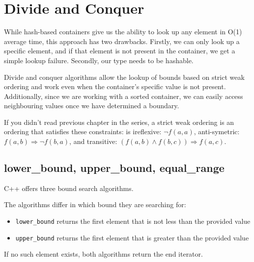 \section{Divide and Conquer}



While hash-based containers give us the ability to look up any element in O(1) average time, this approach has two drawbacks. Firstly, we can only look up a specific element, and if that element is not present in the container, we get a simple lookup failure. Secondly, our type needs to be hashable.

Divide and conquer algorithms allow the lookup of bounds based on strict weak ordering and work even when the container’s specific value is not present. Additionally, since we are working with a sorted container, we can easily access neighbouring values once we have determined a boundary.

If you didn’t read previous chapter in the series, a strict weak ordering is an ordering that satisfies these constraints: is ireflexive: $\neg f(a,a)$, anti-symetric: $f(a,b) \Rightarrow \neg f(b,a)$, and transitive: $(f(a,b) \wedge f(b,c)) \Rightarrow f(a,c)$.

\subsection{lower\_bound, upper\_bound, equal\_range}

C++ offers three bound search algorithms.



The algorithms differ in which bound they are searching for:

\begin{itemize}
    \item \texttt{lower\_bound} returns the first element that is not less than the provided value
    \item \texttt{upper\_bound} returns the first element that is greater than the provided value
\end{itemize}

If no such element exists, both algorithms return the end iterator.

